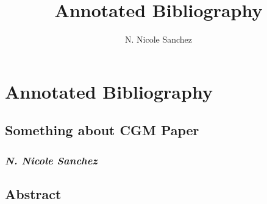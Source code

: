\documentclass[12pt]{article}
\begin{document}
\title{Annotated Bibliography}
\author{N. Nicole Sanchez}
\section*{Annotated Bibliography}
\subsection*{Something about CGM Paper}
\subsubsection*{\textit{N. Nicole Sanchez}}

\subsection*{Abstract}




\nocite{*}




\end{document}
